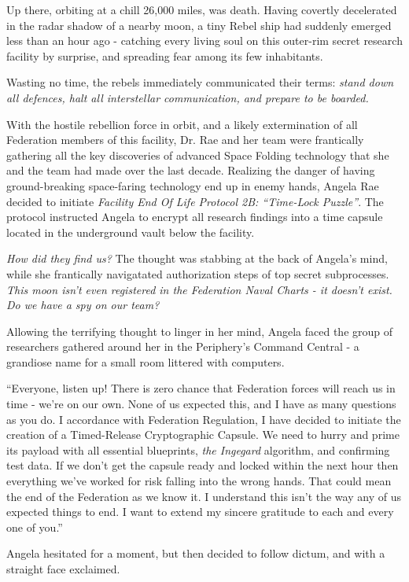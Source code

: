 \documentclass[smalldemyvopaper,11pt,twoside,onecolumn,openright,extrafontsizes]{memoir}
\begin{document}
Up there, orbiting at a chill 26,000 miles, was death. Having covertly decelerated in the radar shadow of a nearby moon, a tiny Rebel ship had suddenly emerged less than an hour ago - catching every living soul on this outer-rim secret research facility by surprise, and spreading fear among its few inhabitants. 

Wasting no time, the rebels immediately communicated their terms: \textit{stand down all defences, halt all interstellar communication, and prepare to be boarded.}

 
With the hostile rebellion force in orbit, and a likely extermination of all Federation members of this facility, Dr. Rae and her team were frantically gathering all the key discoveries of advanced Space Folding technology that she and the team had made over the last decade. Realizing the danger of having ground-breaking space-faring technology end up in enemy hands, Angela Rae decided to initiate \textit{Facility End Of Life Protocol 2B: “Time-Lock Puzzle”}. The protocol instructed Angela to encrypt all research findings into a time capsule located in the underground vault below the facility.

 
  \textit{How did they find us?} The thought was stabbing at the back of Angela’s mind, while she frantically navigatated authorization steps of top secret subprocesses. \textit{This moon isn’t even registered in the Federation Naval Charts - it doesn’t exist. Do we have a spy on our team?}

 Allowing the terrifying thought to linger in her mind, Angela faced the group of researchers gathered around her in the Periphery’s Command Central - a grandiose name for a small room littered with computers.

 
 “Everyone, listen up! There is zero chance that Federation forces will reach us in time - we’re on our own. None of us expected this, and I have as many questions as you do. I accordance with Federation Regulation, I have decided to initiate the creation of a Timed-Release Cryptographic Capsule. We need to hurry and prime its payload with all essential blueprints, \textit{the Ingegard} algorithm, and confirming test data. If we don’t get the capsule ready and locked within the next hour then everything we’ve worked for risk falling into the wrong hands. That could mean the end of the Federation as we know it. I understand this isn’t the way any of us expected things to end. I want to extend my sincere gratitude to each and every one of you.”

 Angela hesitated for a moment, but then decided to follow dictum, and with a straight face exclaimed.
\end{document}
